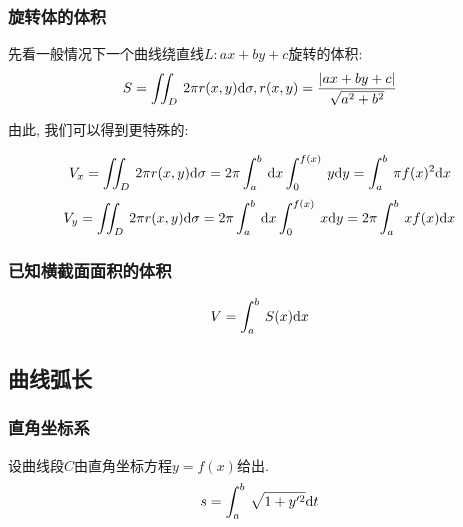 \subsubsection{旋转体的体积}
先看一般情况下一个曲线绕直线$ L:ax+by+c $旋转的体积:
\begin{equation*}
    S=\displaystyle\iint_{D}\hspace{.2em}2\pi r(x,y)\mathrm{d}\sigma, r(x,y)=\frac{|ax+by+c|}{\sqrt{a^{2}+b^{2}}}
\end{equation*}\par
由此, 我们可以得到更特殊的:\par \vspace{.5em}
\begin{equation*}
    V_{x}=\displaystyle\iint_{D}\hspace{.2em}2\pi r(x,y)\mathrm{d}\sigma=2\pi\displaystyle\int_{a}^{b}\hspace{.2em}\mathrm{d}x\displaystyle\int_{0}^{f(x)}\hspace{.2em}y \mathrm{d}y=\displaystyle\int_{a}^{b}\hspace{.2em}\pi f(x)^{2}\mathrm{d}x
\end{equation*}
\begin{equation*}
    V_{y}=\displaystyle\iint_{D}\hspace{.2em}2\pi r(x,y)\mathrm{d}\sigma=2\pi\displaystyle\int_{a}^{b}\hspace{.2em}\mathrm{d}x\displaystyle\int_{0}^{f(x)}\hspace{.2em}x \mathrm{d}y=2\pi\displaystyle\int_{a}^{b}\hspace{.2em}xf(x)\mathrm{d}x
\end{equation*}
\subsubsection{已知横截面面积的体积}
\begin{equation*}
    V=\displaystyle\int_{a}^{b}\hspace{.2em}S(x)\mathrm{d}x
\end{equation*}
\subsection{曲线弧长}
\subsubsection{直角坐标系}
设曲线段$ C $由直角坐标方程$ y=f(x) $给出.
\begin{equation*}
    s=\displaystyle\int_{a}^{b}\hspace{.2em}\sqrt{1+y'^{2}}\mathrm{d}t
\end{equation*}
